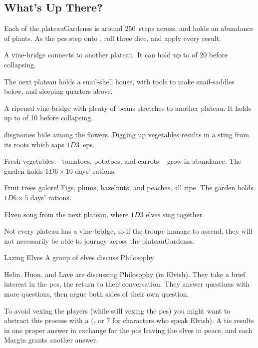 \begin{multicols}{2}

\subsection{What's Up There?}

Each of the \glspl{plateauGardens} is around 250~\glspl{step} across, and holds an abundance of plants.
As the \glspl{pc} step onto , roll three dice, and apply every result.

\begin{dlist}
  \item
  A vine-bridge connects to another plateau.
  It can hold up to  of 20 before collapsing.
  
  The next plateau holds a snail-shell house, with tools to make snail-saddles below, and sleeping quarters above.
  \item
  A ripened vine-bridge with plenty of beans stretches to another plateau.
  It holds up to  of 10 before collapsing.
  \item
  \Glspl{disgnome} hide among the flowers.
  Digging up vegetables results in a sting from its roots which saps $1D3$~\glspl{ep}.
  \item
  Fresh vegetables -- tomatoes, potatoes, and carrots -- grow in abundance.
  The garden holds $1D6 \times 10$ days' \glspl{ration}.
  \item
  Fruit trees galore!
  Figs, plums, hazelnuts, and peaches, all ripe.
  The garden holds $1D6 \times 5$ days' \glspl{ration}.
  \item
  Elven song from the next plateau, where $1D3$ elves sing together.
\end{dlist}

Not every plateau has a vine-bridge, so if the troupe manage to ascend, they will not necessarily be able to journey across the \glspl{plateauGardens}.


{Lazing Elves}%
{A group of elves discuss Philosophy}%

Helin, Huon, and Lav\"e are discussing Philosophy (in Elvish).
They take a brief interest in the \glspl{pc}, the return to their conversation.
They answer questions with more questions, then argue both sides of their own question.

To avoid vexing the players (while still vexing the \glspl{pc}) you might want to abstract this process with a  (\tn[10], or 7 for characters who speak Elvish).
A tie results in one proper answer in exchange for the \glspl{pc} leaving the elves in peace, and each Margin grants another answer.


\end{multicols}
